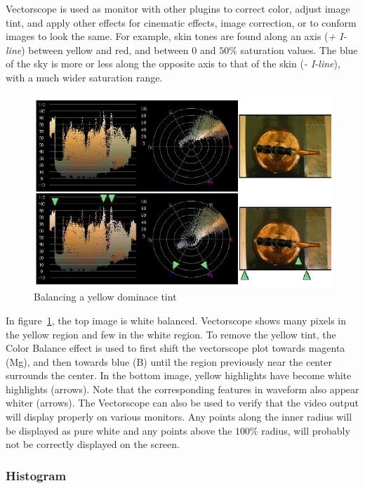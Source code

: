 Vectorscope is used as monitor with other plugins to correct color, adjust image tint, and apply other effects for cinematic effects, image correction, or to conform images to look the same. For example, skin tones are found along an axis (\textit{+ I-line}) between yellow and red, and between $0$ and $50\%$ saturation values. The blue of the sky is more or less along the opposite axis to that of the skin (\textit{- I-line}), with a much wider saturation range.

\begin{figure}[hbtp]
    \centering
    \includegraphics[width=0.9\linewidth]{images/videoscope04.png}
    \caption{Balancing a yellow dominace tint}
    \label{fig:videoscope04}
\end{figure}

In figure~\ref{fig:videoscope04}, the top image is white balanced. Vectorscope shows many pixels in the yellow region and few in the white region. To remove the yellow tint, the Color Balance effect is used to first shift the vectorscope plot towards magenta (Mg), and then towards blue (B) until the region previously near the center surrounds the center. In the bottom image, yellow highlights have become white highlights (arrows). Note that the corresponding features in waveform also appear whiter (arrows).
The Vectorscope can also be used to verify that the video output will display properly on various monitors. Any points along the inner radius will be displayed as pure white and any points above the $100\%$ radius, will probably not be correctly displayed on the screen.

\subsubsection*{Histogram}%
\label{ssub:histogram}

